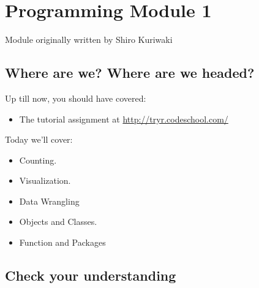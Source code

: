 \documentclass[]{book}
\providecommand{\tightlist}{%
  \setlength{\itemsep}{0pt}\setlength{\parskip}{0pt}}
\theoremstyle{definition}
\theoremstyle{definition}
\theoremstyle{definition}
\theoremstyle{remark}
\begin{document}
\begin{comment}
n_seq <- 1:100; numerator <- (5 * exp(0.5 * n_seq) + n_seq^2 + n_seq / 2) 
denominator <- exp(n_seq)
numerator / denominator <= (1 * denominator) / denominator
\end{comment}

\chapter{Programming Module 1}\label{programming-module-1}

Module originally written by Shiro Kuriwaki

\section{Where are we? Where are we
headed?}\label{where-are-we-where-are-we-headed}

Up till now, you should have covered:

\begin{itemize}
\tightlist
\item
  The tutorial assignment at \url{http://tryr.codeschool.com/}
\end{itemize}

Today we'll cover:

\begin{itemize}
\tightlist
\item
  Counting.
\item
  Visualization.
\item
  Data Wrangling
\item
  Objects and Classes.
\item
  Function and Packages
\end{itemize}

\section{Check your understanding}\label{check-your-understanding}
\end{document}
